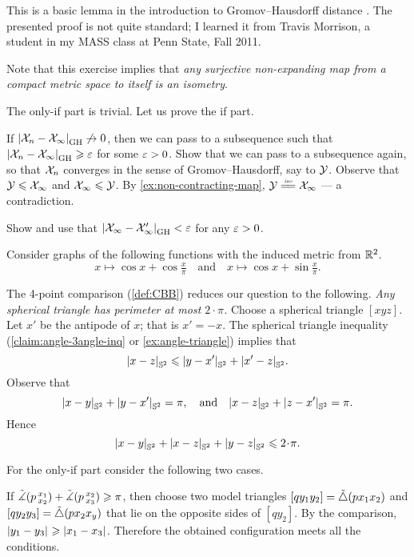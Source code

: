 This is a basic lemma in the introduction to Gromov--Hausdorff distance \cite[see 7.3.30 in][]{burago-burago-ivanov}.
The presented proof is not quite standard;
I learned it from Travis Morrison, 
a student in my MASS class at Penn State, Fall 2011.

Note that this exercise implies that \textit{any surjective non-expanding map from a compact metric space to itself is an isometry}.

The only-if part is trivial. 
Let us prove the if part.

If $|{\mathcal{X}_n}-{\mathcal{X}_\infty}|_{\operatorname{\rm GH}\nolimits}^{{}}\not\to 0$, then we can pass to a subsequence such that $|{\mathcal{X}_n}-{\mathcal{X}_\infty}|_{\operatorname{\rm GH}\nolimits}^{{}}\geqslant\varepsilon$ for some $\varepsilon>0$.
Show that we can pass to a subsequence again, so that $\mathcal{X}_n$ converges in the sense of Gromov--Hausdorff, say to $\mathcal{Y}$.
Observe that $\mathcal{Y}\leqslant \mathcal{X}_\infty$ and $\mathcal{X}_\infty\leqslant\mathcal{Y}$.
By \ref{ex:non-contracting-map}, $\spc{Y}\iso \spc{X}_\infty$ --- a contradiction.

 Show and use that $|{\mathcal{X}_\infty}-{\mathcal{X}_\infty'}|_{\operatorname{\rm GH}\nolimits}^{{}}<\varepsilon$ for any $\varepsilon>0$.

Consider graphs of the following functions with the induced metric from $\mathbb{R}^2$.
\[
x\mapsto \cos x+\cos \tfrac x\pi
\quad\text{and}\quad
x\mapsto \cos x+\sin \tfrac x\pi.
\]

The 4-point comparison (\ref{def:CBB}) reduces our question to the following.
\textit{Any spherical triangle has perimeter at most $2\cdot\pi$.}
Choose a spherical triangle $[xyz]$.
Let $x'$ be the antipode of $x$; that is $x'=-x$.
The spherical triangle inequality (\ref{claim:angle-3angle-inq} or \ref{ex:angle-triangle}) implies that
\[|{x}-{z}|_{\mathbb{S}^2}^{{}}\leqslant |{y}-{x'}|_{\mathbb{S}^2}^{{}}+|{x'}-{z}|_{\mathbb{S}^2}^{{}}.\]
Observe that 
\[
|{x}-{y}|_{\mathbb{S}^2}^{{}}+|{y}-{x'}|_{\mathbb{S}^2}^{{}}=\pi,
\quad\text{and}\quad
|{x}-{z}|_{\mathbb{S}^2}^{{}}+|{z}-{x'}|_{\mathbb{S}^2}^{{}}=\pi.
\]
Hence
\[\dist{x}{y}{\mathbb{S}^2}+\dist{x}{z}{\mathbb{S}^2}+\dist{y}{z}{\mathbb{S}^2}\le2\cdot \pi.\]

 For the only-if part consider the following two cases.

If $\tilde\measuredangle(p\,{}^{x_1}_{x_2})+\tilde\measuredangle(p\,{}^{x_2}_{x_3})\geqslant \pi$, then choose two model triangles $[qy_1y_2]=\tilde\triangle(px_1x_2)$ and $[qy_2y_3]=\tilde\triangle(px_2x_y)$ that lie on the opposite sides of $[qy_2]$.
By the comparison, $|{y_1}-{y_3}|_{}^{{}}\geqslant |{x_1}-{x_3}|_{}^{{}}$.
Therefore the obtained configuration meets all the conditions.

